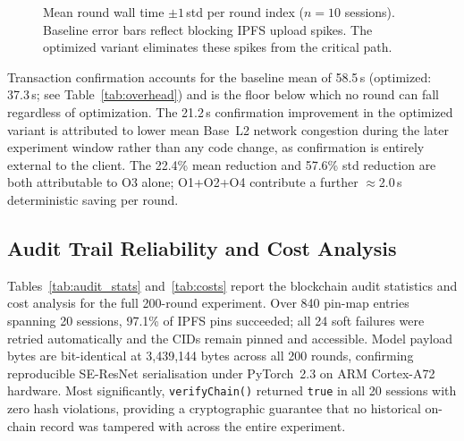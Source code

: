\documentclass{llncs}
\begin{document}
\begin{figure}[htbp]
\centering
{}
\caption{Mean round wall time $\pm1$\,std per round index ($n=10$
  sessions). Baseline error bars reflect blocking IPFS upload spikes.
  The optimized variant eliminates these spikes from the critical path.}
\label{fig:walltime}
\end{figure}

Transaction confirmation accounts for the baseline mean of 58.5\,s
(optimized: 37.3\,s; see Table~\ref{tab:overhead}) and is the floor below which no round can fall
regardless of optimization. The 21.2\,s confirmation improvement in the
optimized variant is attributed to lower mean Base~L2 network congestion
during the later experiment window rather than any code change, as
confirmation is entirely external to the client. The 22.4\% mean reduction
and 57.6\% std reduction are both attributable to O3 alone; O1+O2+O4
contribute a further $\approx$2.0\,s deterministic saving per round.

\subsection{Audit Trail Reliability and Cost Analysis}
\label{subsec:cost}

Tables~\ref{tab:audit_stats} and~\ref{tab:costs} report the blockchain audit
statistics and cost analysis for the full 200-round experiment. Over 840
pin-map entries spanning 20 sessions, 97.1\% of IPFS pins succeeded; all 24
soft failures were retried automatically and the CIDs remain pinned and
accessible. Model payload bytes are bit-identical at 3{,}439{,}144 bytes
across all 200 rounds, confirming reproducible SE-ResNet serialisation under
PyTorch~2.3 on ARM Cortex-A72 hardware. Most significantly, \texttt{verifyChain()}
returned \texttt{true} in all 20 sessions with zero hash violations, providing
a cryptographic guarantee that no historical on-chain record was tampered with
across the entire experiment.
\end{document}
